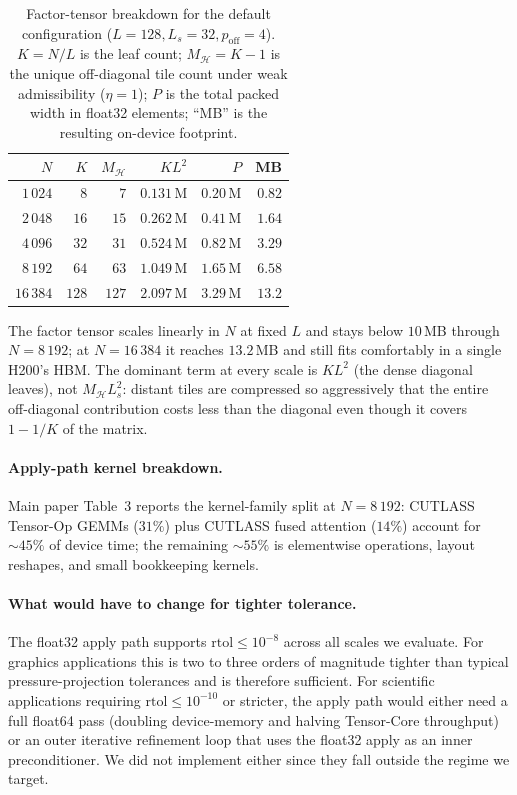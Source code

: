 \documentclass[acmtog]{acmart}
\begin{document}
\begin{table}[H]
\centering
\caption{Factor-tensor breakdown for the default configuration
($L\!=\!128, L_s\!=\!32, p_{\mathrm{off}}\!=\!4$). $K\!=\!N/L$ is the leaf
count; $M_{\mathcal{H}}\!=\!K\!-\!1$ is the unique off-diagonal tile count
under weak admissibility ($\eta\!=\!1$); $P$ is the total packed width in
float32 elements; ``MB'' is the resulting on-device footprint.}
\label{tab:supp_memory}
\footnotesize\setlength{\tabcolsep}{4pt}
\begin{tabular}{@{}r rrr rr@{}}
\toprule
$N$ & $K$ & $M_{\mathcal{H}}$ & $KL^2$ & $P$ & MB \\
\midrule
$1\,024$  & $8$            & $7$   & $0.131$\,M & $0.20$\,M & $0.82$ \\
$2\,048$  & $16$           & $15$  & $0.262$\,M & $0.41$\,M & $1.64$ \\
$4\,096$  & $32$           & $31$  & $0.524$\,M & $0.82$\,M & $3.29$ \\
$8\,192$  & $64$           & $63$  & $1.049$\,M & $1.65$\,M & $6.58$ \\
$16\,384$ & $128$          & $127$ & $2.097$\,M & $3.29$\,M & $13.2$ \\
\bottomrule
\end{tabular}
\end{table}

\noindent
The factor tensor scales linearly in $N$ at fixed $L$ and stays below
$10$\,MB through $N\!=\!8\,192$; at $N\!=\!16\,384$ it reaches
$13.2$\,MB and still fits comfortably in a single H200's HBM. The dominant term
at every scale is $KL^2$ (the dense diagonal
leaves), not $M_{\mathcal{H}} L_s^2$: distant tiles are compressed so
aggressively that the entire off-diagonal contribution costs less than the
diagonal even though it covers $1\!-\!1/K$ of the matrix.

\paragraph{Apply-path kernel breakdown.}
Main paper Table~3 reports the kernel-family split at $N\!=\!8\,192$: CUTLASS
Tensor-Op GEMMs ($31\%$) plus CUTLASS fused attention ($14\%$) account for
$\sim\!45\%$ of device time; the remaining $\sim\!55\%$ is elementwise
operations, layout reshapes, and small bookkeeping kernels.

\paragraph{What would have to change for tighter tolerance.}
The float32 apply path supports $\mathrm{rtol}\!\le\!10^{-8}$ across all scales
we evaluate. For graphics applications this is two to three orders of
magnitude tighter than typical pressure-projection tolerances and is therefore
sufficient. For scientific applications requiring $\mathrm{rtol}\!\le\!10^{-10}$
or stricter, the apply path would either need a full float64 pass (doubling
device-memory and halving Tensor-Core throughput) or an outer iterative
refinement loop that uses the float32 apply as an inner preconditioner. We did
not implement either since they fall outside the regime we target.
\end{document}
